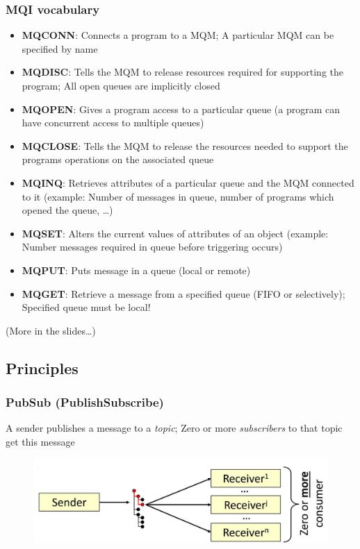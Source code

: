 			\subsubsection{MQI vocabulary}
				\begin{itemize}
					\item \textbf{MQCONN}: Connects a program to a MQM; A particular MQM can be specified by name
					
					\item \textbf{MQDISC}: Tells the MQM to release resources required for supporting the program; All open queues are implicitly closed
					
					\item \textbf{MQOPEN}: Gives a program access to a particular queue (a program can have concurrent access to multiple queues)
					
					\item \textbf{MQCLOSE}: Tells the MQM to release the resources needed to support the programs operations on the associated queue
					
					\item \textbf{MQINQ}: Retrieves attributes of a particular queue and the MQM connected to it (example: Number of messages in queue, number of programs which opened the queue, \ldots)
					
					\item \textbf{MQSET}: Alters the current values of attributes of an object (example: Number messages required in queue before triggering occurs)
					
					\item \textbf{MQPUT}: Puts message in a queue (local or remote)
					
					\item \textbf{MQGET}: Retrieve a message from a specified queue (FIFO or selectively); Specified queue must be local!

				\end{itemize}
				(More in the slides\ldots)
				
		
		\subsection{Principles}
			\subsubsection{PubSub (PublishSubscribe)}
				A sender publishes a message to a \textit{topic}; Zero or more \textit{subscribers} to that topic get this message
				\begin{figure}[h!]
					\includegraphics[scale=0.25]{res/pubsub.jpg}
				\end{figure}
			
